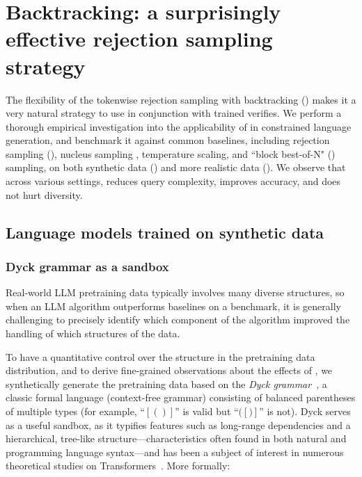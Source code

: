 \section{\hspace{-2.5mm}Backtracking: a surprisingly effective rejection sampling strategy}
\label{sec:experiments}

The flexibility of the tokenwise rejection sampling with backtracking () makes it a very natural strategy to use in conjunction with trained verifies. We perform a thorough empirical investigation into the applicability of \algoName in constrained language generation,
and benchmark it against common baselines,
including rejection sampling (),
nucleus sampling \citep{holtzman2020the},
temperature scaling,
and ``block best-of-N" () sampling,
on both synthetic data () and more realistic data ().
We observe that across various settings, 
\algoName reduces query complexity, improves accuracy, and does not hurt diversity.

\subsection{Language models trained on synthetic data}
\label{sec:experiments:synthetic}

\subsubsection{Dyck grammar as a sandbox}
\label{sec:experiments:synthetic:dyck}

Real-world LLM pretraining data \citep{li2024datacomp} typically involves many diverse structures, 
so when an LLM algorithm outperforms baselines on a benchmark, it is generally challenging to precisely identify which component of the algorithm improved the handling of which structures of the data.

To have a quantitative control over the structure in the pretraining data distribution,
and to derive fine-grained observations about the effects of \algoName,
we synthetically generate the pretraining data based on the \emph{Dyck grammar}~\citep{SCHUTZENBERGER1963246},
a classic formal language (context-free grammar) consisting of balanced parentheses of multiple types
(for example, ``$[()]$'' is valid but ``$([)]$'' is not). 
Dyck serves as a useful sandbox, as it typifies features such as long-range dependencies and a hierarchical, tree-like structure—characteristics often found in both natural and programming language syntax—and has been a subject of interest in numerous theoretical studies on Transformers~\citep{yao2021self,liu2023same,liu2023Transformers,wen2023uninterpretability}.
More formally:

